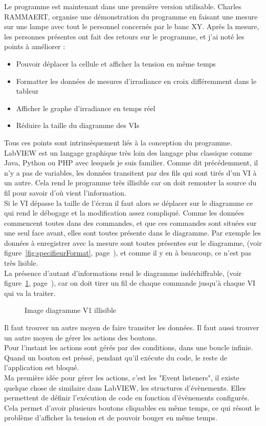 \documentclass[12pt]{article}
\begin{document}
Le programme est maintenant dans une première version utilisable.
Charles RAMMAERT, organise une démonstration du programme en faisant une mesure sur une lampe avec tout le personnel concernés par le banc XY.
Après la mesure, les personnes présentes ont fait des retours sur le programme, et j'ai noté les points à améliorer :
\begin{itemize}
	\item Pouvoir déplacer la cellule et afficher la tension en même temps
	\item Formatter les données de mesures d'irradiance en croix différemment dans le tableur
	\item Afficher le graphe d'irradiance en temps réel
	\item Réduire la taille du diagramme des VIs
\end{itemize}
Tous ces points sont intrinsèquement liés à la conception du programme.\\
LabVIEW est un langage graphique très loin des langage plus classique comme Java, Python ou PHP avec lesquels je suis familier.
Comme dit précédemment, il n'y a pas de variables, les données transitent par des fils qui sont tirés d'un VI à un autre.
Cela rend le programme très illisible car on doit remonter la source du fil pour savoir d'où vient l'information.\\
Si le VI dépasse la taille de l'écran il faut alors se déplacer sur le diagramme ce qui rend le débogage et la modification assez compliqué.
Comme les données commencent toutes dans des commandes, et que ces commandes sont situées sur une seul face avant, elles sont toutes présente dans le diagramme.
Par exemple les données à enregistrer avec la mesure sont toutes présentes sur le diagramme, (voir figure~\ref{fig:specifieurFormat}, page~\pageref{fig:specifieurFormat}), et comme il y en à beaucoup, ce n'est pas très lisible.\\
La présence d'autant d'informations rend le diagramme indéchiffrable, (voir figure~\ref{fig:diagrammeV1}, page~\pageref{fig:diagrammeV1}), car on doit tirer un fil de chaque commande jusqu'à chaque VI qui va la traiter.
\begin{figure}[p]
	\centering
	\caption{Image diagramme V1 illisible}
	\label{fig:diagrammeV1}
\end{figure}
Il faut trouver un autre moyen de faire transiter les données.
Il faut aussi trouver un autre moyen de gérer les actions des boutons.\\
Pour l'instant les actions sont gérés par des conditions, dans une boucle infinie. Quand un bouton est préssé, pendant qu'il exécute du code, le reste de l'application est bloqué.\\
Ma première idée pour gérer les actions, c'est les "Event listeners", il existe quelque chose de similaire dans LabVIEW, les structures d'évènements.
Elles permettent de définir l'exécution de code en fonction d'évènements configurés.
Cela permet d'avoir plusieurs boutons cliquables en même temps, ce qui résout le problème d'afficher la tension et de pouvoir bouger en même temps.
\end{document}
